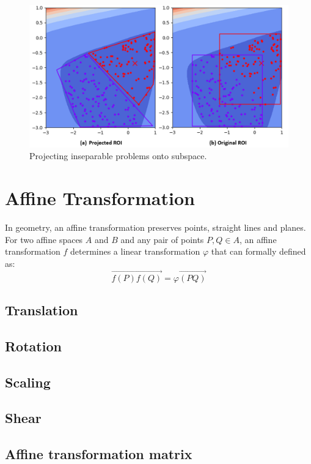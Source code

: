 \begin{figure}
\centering
\includegraphics[width=\textwidth]{Projected_ROI}
\caption{Projecting inseparable problems onto subspace.}\label{fig:Projected_ROI}
\end{figure}



\section{Affine Transformation}
In geometry, an affine transformation preserves points, straight lines and planes.
For two affine spaces $A$ and $B$ and any pair of points $P, Q \in A$,
an affine transformation $f$ determines a linear transformation $\varphi$ that can formally defined as:
\begin{displaymath}
\overrightarrow{f(P)f(Q)} = \varphi \overrightarrow{(PQ)}
\end{displaymath}

\subsection{Translation}
\subsection{Rotation}
\subsection{Scaling}
\subsection{Shear}
\subsection{Affine transformation matrix}






